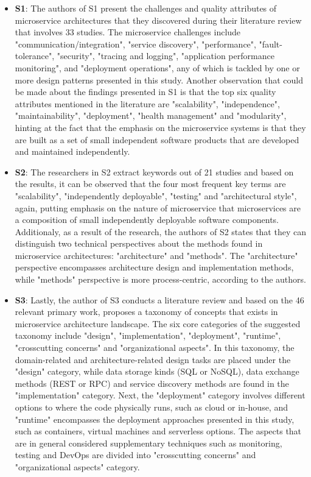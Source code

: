 \documentclass{Configuration_Files/PoliMi3i_thesis}
\begin{document}
\begin{itemize}
    \item \textbf{S1}: The authors of S1 present the challenges and quality attributes of microservice architectures that they discovered during their literature review that involves 33 studies.
    The microservice challenges include "communication/integration", "service discovery", "performance", "fault-tolerance", "security", "tracing and logging", "application performance monitoring", and "deployment operations", any of which is tackled by one or more design patterns presented in this study.
    Another observation that could be made about the findings presented in S1 is that the top six quality attributes mentioned in the literature are "scalability", "independence", "maintainability", "deployment", "health management" and "modularity", hinting at the fact that the emphasis on the microservice systems is that they are built as a set of small independent software products that are developed and maintained independently.
    
    \item \textbf{S2}: The researchers in S2 extract keywords out of 21 studies and based on the results, it can be observed that the four most frequent key terms are "scalability", "independently deployable", "testing" and "architectural style", again, putting emphasis on the nature of microservice that microservices are a composition of small independently deployable software components.
    Additionaly, as a result of the research, the authors of S2 states that they can distinguish two technical perspectives about the methods found in microservice architectures: "architecture" and "methods".
    The "architecture" perspective encompasses architecture design and implementation methods, while "methods" perspective is more process-centric, according to the authors.
    
    \item \textbf{S3}: Lastly, the author of S3 conducts a literature review and based on the 46 relevant primary work, proposes a taxonomy of concepts that exists in microservice architecture landscape.
    The six core categories of the suggested taxonomy include "design", "implementation", "deployment", "runtime", "crosscutting concerns" and "organizational aspects".
    In this taxonomy, the domain-related and architecture-related design tasks are placed under the "design" category, while data storage kinds (SQL or NoSQL), data exchange methods (REST or RPC) and service discovery methods are found  in the "implementation" category.
    Next, the "deployment" category involves different options to where the code physically runs, such as cloud or in-house, and "runtime" encompasses the deployment approaches presented in this study, such as containers, virtual machines and serverless options.
    The aspects that are in general considered supplementary techniques such as monitoring, testing and DevOps are divided into "crosscutting concerns" and "organizational aspects" category.
\end{itemize}
\end{document}

